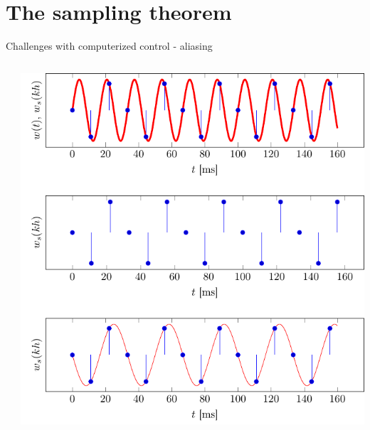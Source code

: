 \documentclass[presentation,aspectratio=169]{beamer}
\begin{document}
\section{The sampling theorem}
\label{sec:orgf503a06}
\begin{frame}[label={sec:org881e394}]{Challenges with computerized control - aliasing}
\begin{columns}
\begin{column}{0.6\columnwidth}
\begin{center}
\end{center}
\end{column}
\begin{column}{0.4\columnwidth}
\includegraphics[width=0.99\linewidth]{../../figures/aliasing-example-60Hz}
\end{column}
\end{columns}
\end{frame}
\end{document}
